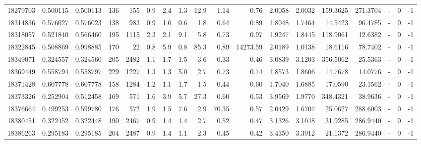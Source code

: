 \begin{tabular}{rrrrrrrrrrrrrrrlrr}
  18279703 & 0.500115 &   0.500113 &  136 &  155 &      0.9 &      2.4 &     1.3 &     12.9 &       1.14 &        0.76 &  2.0058 &  2.0032 &  159.3625 &  271.3704 &             - &        0 &         -1 \\
  18314836 & 0.576027 &   0.576023 &  138 &  983 &      0.9 &      1.0 &     0.6 &      1.8 &       0.64 &        0.89 &  1.8048 &  1.7464 &   14.5423 &   96.4785 &             - &        0 &         -1 \\
  18318057 & 0.521840 &   0.566460 &  195 & 1115 &      2.3 &      2.1 &     9.1 &      5.8 &       0.73 &        0.97 &  1.9247 &  1.8445 &  118.9061 &   12.6382 &             - &        0 &         -1 \\
  18322845 & 0.508869 &   0.998885 &  170 &   22 &      0.8 &      5.9 &     0.8 &     85.3 &       0.89 &    14273.59 &  2.0189 &  1.0138 &   18.6116 &   78.7402 &             - &        0 &         -1 \\
  18349071 & 0.324557 &   0.324560 &  205 & 2482 &      1.1 &      1.7 &     1.5 &      3.6 &       0.33 &        0.46 &  3.0839 &  3.1203 &  356.5062 &   25.5363 &             - &        0 &         -1 \\
  18369449 & 0.558794 &   0.558797 &  229 & 1227 &      1.3 &      1.3 &     5.0 &      2.7 &       0.73 &        0.74 &  1.8573 &  1.8606 &   14.7678 &   14.0776 &             - &        0 &         -1 \\
  18371428 & 0.607778 &   0.607778 &  158 & 1284 &      1.2 &      1.1 &     1.7 &      1.5 &       0.44 &        0.60 &  1.7040 &  1.6885 &   17.0590 &   23.1562 &             - &        0 &         -1 \\
  18373326 & 0.252904 &   0.512458 &  169 &  571 &      1.6 &      3.9 &     5.7 &     27.3 &       0.60 &        0.53 &  3.9569 &  1.9770 &  348.4321 &   38.9636 &             - &        0 &         -1 \\
  18376664 & 0.499253 &   0.599780 &  176 &  572 &      1.9 &      1.5 &     7.6 &      2.9 &      70.35 &        0.57 &  2.0429 &  1.6707 &   25.0627 &  288.6003 &             - &        0 &         -1 \\
  18380451 & 0.322452 &   0.322448 &  190 & 2467 &      0.9 &      1.4 &     1.4 &      2.7 &       0.52 &        0.47 &  3.1326 &  3.1048 &   31.9285 &  286.9440 &             - &        0 &         -1 \\
  18386263 & 0.295183 &   0.295185 &  204 & 2487 &      0.9 &      1.4 &     1.1 &      2.3 &       0.45 &        0.42 &  3.4350 &  3.3912 &   21.1372 &  286.9440 &             - &        0 &         -1 \\

\end{tabular}
